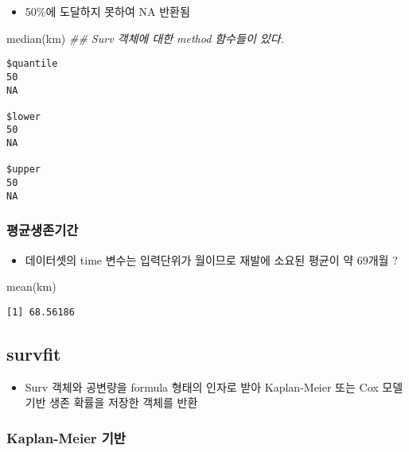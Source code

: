 \documentclass[
  letterpaper,
  DIV=11,
  numbers=noendperiod]{scrartcl}
\newenvironment{Shaded}{\begin{snugshade}}{\end{snugshade}}
\newcommand{\DocumentationTok}[1]{\textcolor[rgb]{0.37,0.37,0.37}{\textit{#1}}}
\newcommand{\FunctionTok}[1]{\textcolor[rgb]{0.28,0.35,0.67}{#1}}
\newcommand{\NormalTok}[1]{\textcolor[rgb]{0.00,0.23,0.31}{#1}}
\providecommand{\tightlist}{%
  \setlength{\itemsep}{0pt}\setlength{\parskip}{0pt}}\usepackage{longtable,booktabs,array}
\begin{document}
\begin{itemize}
\tightlist
\item
  50\%에 도달하지 못하여 NA 반환됨
\end{itemize}

\begin{Shaded}
\begin{Highlighting}[]
\FunctionTok{median}\NormalTok{(km)  }\DocumentationTok{\#\# Surv 객체에 대한 method 함수들이 있다.}
\end{Highlighting}
\end{Shaded}

\begin{verbatim}
$quantile
50 
NA 

$lower
50 
NA 

$upper
50 
NA 
\end{verbatim}

\subsubsection{평균생존기간}\label{uxd3c9uxade0uxc0dduxc874uxae30uxac04}

\begin{itemize}
\tightlist
\item
  데이터셋의 time 변수는 입력단위가 월이므로 재발에 소요된 평균이 약
  69개월 ?
\end{itemize}

\begin{Shaded}
\begin{Highlighting}[]
\FunctionTok{mean}\NormalTok{(km)}
\end{Highlighting}
\end{Shaded}

\begin{verbatim}
[1] 68.56186
\end{verbatim}

\subsection{survfit}\label{survfit}

\begin{itemize}
\tightlist
\item
  Surv 객체와 공변량을 formula 형태의 인자로 받아 Kaplan-Meier 또는 Cox
  모델 기반 생존 확률을 저장한 객체를 반환
\end{itemize}

\subsubsection{Kaplan-Meier 기반}\label{kaplan-meier-uxae30uxbc18}
\end{document}
